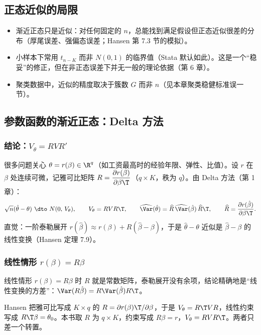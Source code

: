 \subsection{正态近似的局限}

\begin{itemize}
\item 渐近正态只是近似：对任何固定的 $n$，总能找到满足假设但正态近似很差的分布（厚尾误差、强偏态误差；Hansen 第 7.3 节的模拟）。
\item 小样本下常用 $t_{n-K}$ 而非 $N(0,1)$ 的临界值（Stata 默认如此）。这是一个“稳妥”的修正，但在非正态误差下并无一般的理论依据（第 6 章）。
\item 聚类数据中，近似的精度取决于簇数 $G$ 而非 $n$（见本章聚类稳健标准误一节）。
\end{itemize}

\subsection{参数函数的渐近正态：Delta 方法}

\subsubsection{结论：\texorpdfstring{$V_\theta=RVR'$}{V\_theta = R V R'}}

很多问题关心 $\theta=r(\beta)\in\R^q$（如工资最高时的经验年限、弹性、比值）。设 $r$ 在 $\beta$ 处连续可微，记雅可比矩阵 $R=\dfrac{\partial r(\beta)}{\partial\beta\T}$（$q\times K$，秩为 $q$）。由 Delta 方法（第 1 章）：
\begin{equation}\label{eq:U05a-delta}
\sqrt n(\hat\theta-\theta)\ \dto\ N(0,\,V_\theta),\qquad V_\theta=RVR\T,\qquad
\widehat\Var(\hat\theta)=\widehat R\,\widehat\Var(\hat\beta)\,\widehat R\T,\qquad\widehat R=\frac{\partial r(\hat\beta)}{\partial\beta\T}.
\end{equation}
直觉：一阶泰勒展开 $r(\hat\beta)\approx r(\beta)+R(\hat\beta-\beta)$，于是 $\hat\theta-\theta$ 近似是 $\hat\beta-\beta$ 的线性变换（Hansen 定理 7.9）。

\subsubsection{线性情形 \texorpdfstring{$r(\beta)=R\beta$}{r(beta) = R beta}}

线性情形 $r(\beta)=R\beta$ 时 $R$ 就是常数矩阵，泰勒展开没有余项，结论精确地是“线性变换的方差”：$\Var(R\hat\beta)=R\Var(\hat\beta)R\T$。

\begin{note}
Hansen 把雅可比写成 $K\times q$ 的 $R=\partial r(\beta)\T/\partial\beta$，于是 $V_\theta=R\T VR$，线性约束写成 $R\T\beta=\theta_0$。本书取 $R$ 为 $q\times K$，约束写成 $R\beta=r$，$V_\theta=RVR\T$。两者只差一个转置。
\end{note}

